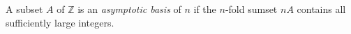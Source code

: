 \documentclass[12pt]{article}
\begin{document}
A subset $A$ of $\mathbb{Z}$ is an \emph{asymptotic basis} of  $n$ if the $n$-fold sumset $nA$
contains all sufficiently large integers.
\end{document}
